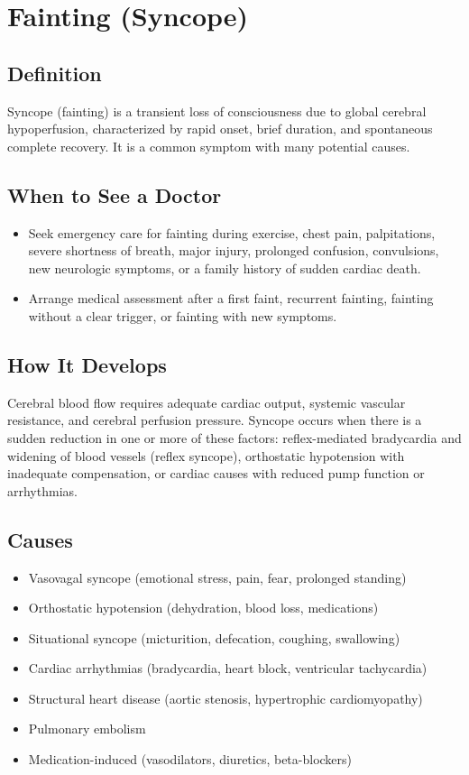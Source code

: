 \chapter{Fainting (Syncope)}

\section*{Definition}
Syncope (fainting) is a transient loss of consciousness due to global cerebral hypoperfusion, characterized by rapid onset, brief duration, and spontaneous complete recovery. It is a common symptom with many potential causes.

\section*{When to See a Doctor}
\begin{itemize}
\item Seek emergency care for fainting during exercise, chest pain, palpitations, severe shortness of breath, major injury, prolonged confusion, convulsions, new neurologic symptoms, or a family history of sudden cardiac death.
\item Arrange medical assessment after a first faint, recurrent fainting, fainting without a clear trigger, or fainting with new symptoms.
\end{itemize}

\section*{How It Develops}
Cerebral blood flow requires adequate cardiac output, systemic vascular resistance, and cerebral perfusion pressure. Syncope occurs when there is a sudden reduction in one or more of these factors: reflex-mediated bradycardia and widening of blood vessels (reflex syncope), orthostatic hypotension with inadequate compensation, or cardiac causes with reduced pump function or arrhythmias.

\section*{Causes}
\begin{itemize}
\item Vasovagal syncope (emotional stress, pain, fear, prolonged standing)
\item Orthostatic hypotension (dehydration, blood loss, medications)
\item Situational syncope (micturition, defecation, coughing, swallowing)
\item Cardiac arrhythmias (bradycardia, heart block, ventricular tachycardia)
\item Structural heart disease (aortic stenosis, hypertrophic cardiomyopathy)
\item Pulmonary embolism
\item Medication-induced (vasodilators, diuretics, beta-blockers)
\end{itemize}

